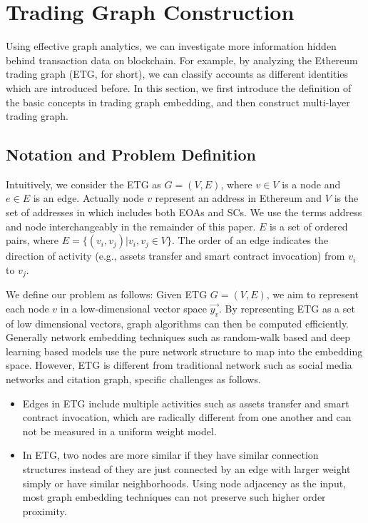 
\section{Trading Graph Construction}
Using effective graph analytics, we can investigate more information hidden behind transaction data on blockchain. For example, by analyzing the Ethereum trading graph (ETG, for short), we can classify accounts as different identities which are introduced before. In this section, we first introduce the definition of the basic concepts in trading graph embedding, and then construct multi-layer trading graph.

\subsection{Notation and Problem Definition}
Intuitively, we consider the ETG as $G=(V,E)$, where $v \in V$ is a node and $e \in E$ is an edge. Actually node $v$ represent an address in Ethereum and $V$ is the set of addresses in which includes both EOAs and SCs. We use the terms address and node interchangeably in the remainder of this paper. $E$ is a set of ordered pairs, where $E=\{(v_i,v_j)|v_i,v_j \in V\}$. The order of an edge indicates the direction of activity (e.g., assets transfer and smart contract invocation) from $v_i$ to $v_j$. 

We define our problem as follows: Given ETG $G=(V,E)$, we aim to represent each node $v$ in a low-dimensional vector space $\vec{y_v}$. By representing ETG as a set of low dimensional vectors, graph algorithms can then be computed efficiently. Generally network embedding techniques such as random-walk based and deep learning based models use the pure network structure to map into the embedding space\cite{goyal2018capturing}. However, ETG is different from traditional network such as social media networks and citation graph, specific challenges as follows. 

\begin{itemize}
\item Edges in ETG include multiple activities such as assets transfer and smart contract invocation, which are radically different from one another and can not be measured in a uniform weight model.
\item In ETG, two nodes are more similar if they have similar connection structures instead of they are just connected by an edge with larger weight simply or have similar neighborhoods. Using node adjacency as the input, most graph embedding techniques can not preserve such higher order proximity.
\end{itemize}

